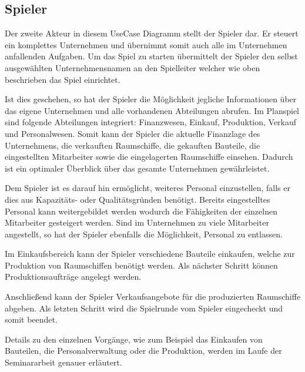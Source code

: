 \subsection{Spieler}
\label{sec:fachkonzept-spieler}

Der zweite Akteur in diesem UseCase Diagramm stellt der Spieler dar. Er steuert ein komplettes Unternehmen und übernimmt somit auch alle im Unternehmen anfallenden Aufgaben.
Um das Spiel zu starten übermittelt der Spieler den selbst ausgewählten Unternehmensnamen an den Spielleiter welcher wie oben beschrieben das Spiel einrichtet.

Ist dies geschehen, so hat der Spieler die Möglichkeit jegliche Informationen über das eigene Unternehmen und alle vorhandenen Abteilungen abrufen. Im Planspiel sind folgende Abteilungen integriert: Finanzwesen, Einkauf, Produktion, Verkauf und Personalwesen. Somit kann der Spieler die aktuelle Finanzlage des Unternehmens, die verkauften Raumschiffe, die gekauften Bauteile, die eingestellten Mitarbeiter sowie die eingelagerten Raumschiffe einsehen. Dadurch ist ein optimaler Überblick über das gesamte Unternehmen gewährleistet.

Dem Spieler ist es darauf hin ermöglicht, weiteres Personal einzustellen, falls er dies aus Kapazitäts- oder Qualitätsgründen benötigt. Bereits eingestelltes Personal kann weitergebildet werden wodurch die Fähigkeiten der einzelnen Mitarbeiter gesteigert werden. Sind im Unternehmen zu viele Mitarbeiter angestellt, so hat der Spieler ebenfalls die Möglichkeit, Personal zu entlassen.

Im Einkaufsbereich kann der Spieler verschiedene Bauteile einkaufen, welche zur Produktion von Raumschiffen benötigt werden. Als nächster Schritt können Produktionsaufträge angelegt werden. 

Anschließend kann der Spieler Verkaufsangebote für die produzierten Raumschiffe abgeben. Als letzten Schritt wird die Spielrunde vom Spieler eingecheckt und somit beendet. 

Details zu den einzelnen Vorgänge, wie zum Beispiel das Einkaufen von Bauteilen, die Personalverwaltung oder die Produktion, werden im Laufe der Seminararbeit genauer erläutert.

\autorende{}